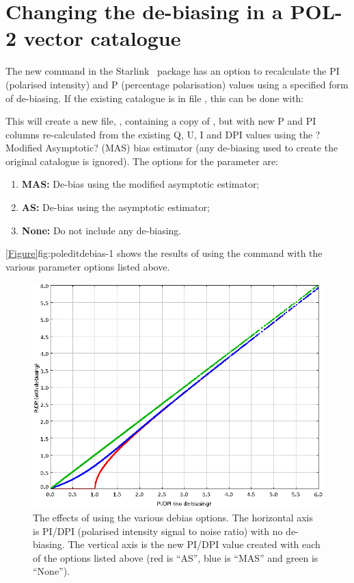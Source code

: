\section{Changing the de-biasing in a POL-2 vector catalogue}

The new  command in the Starlink \POLPACK\ package has an option to recalculate the PI (polarised intensity) and P (percentage polarisation) values using a specified form of de-biasing. If the existing catalogue is in file , this can be done with:

\begin{terminalv}
\end{terminalv}

This will create a new file, , containing a copy of , but with new P and PI columns re-calculated from the existing Q, U, I and DPI values using the ?Modified Asymptotic? (MAS) bias estimator (any de-biasing used to create the original catalogue is ignored). The options for the  parameter are:

\begin{enumerate}
\item {\bf MAS:} De-bias using the modified asymptotic estimator;
\item {\bf AS:} De-bias using the asymptotic estimator;
\item {\bf None:} Do not include any de-biasing.
\end{enumerate}

\cref{Figure}{fig:poleditdebias-1}{} shows the results of using the  command with the various   parameter options listed above.

\begin{figure}[ht!]
\begin{center}
\includegraphics[width=0.46\linewidth]{sc22-poledit-debias.png}
\caption [The effects of using the various  debias options]{
  The effects of using the various  debias options. The horizontal axis is PI/DPI (polarised intensity signal to noise ratio) with no de-biasing. The vertical axis is the new PI/DPI value created with each of the  options listed above (red is ``AS'', blue is ``MAS'' and green is ``None'').
\label{fig:poleditdebias-1}
}
\end{center}
\end{figure}


